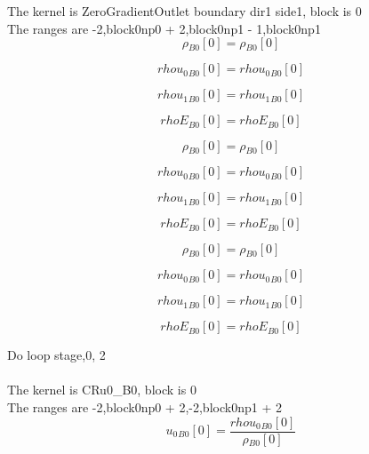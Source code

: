 \documentclass{article}
\begin{document}
\noindent The kernel is ZeroGradientOutlet boundary dir1 side1, block is 0\\\noindent The ranges are -2,block0np0 + 2,block0np1 - 1,block0np1\\\begin{dmath}{\rho{_{B0}}}[{0}] = {\rho{_{B0}}}[{0}]\end{dmath}

\begin{dmath}{rhou_{0}{_{B0}}}[{0}] = {rhou_{0}{_{B0}}}[{0}]\end{dmath}

\begin{dmath}{rhou_{1}{_{B0}}}[{0}] = {rhou_{1}{_{B0}}}[{0}]\end{dmath}

\begin{dmath}{rhoE{_{B0}}}[{0}] = {rhoE{_{B0}}}[{0}]\end{dmath}

\begin{dmath}{\rho{_{B0}}}[{0}] = {\rho{_{B0}}}[{0}]\end{dmath}

\begin{dmath}{rhou_{0}{_{B0}}}[{0}] = {rhou_{0}{_{B0}}}[{0}]\end{dmath}

\begin{dmath}{rhou_{1}{_{B0}}}[{0}] = {rhou_{1}{_{B0}}}[{0}]\end{dmath}

\begin{dmath}{rhoE{_{B0}}}[{0}] = {rhoE{_{B0}}}[{0}]\end{dmath}

\begin{dmath}{\rho{_{B0}}}[{0}] = {\rho{_{B0}}}[{0}]\end{dmath}

\begin{dmath}{rhou_{0}{_{B0}}}[{0}] = {rhou_{0}{_{B0}}}[{0}]\end{dmath}

\begin{dmath}{rhou_{1}{_{B0}}}[{0}] = {rhou_{1}{_{B0}}}[{0}]\end{dmath}

\begin{dmath}{rhoE{_{B0}}}[{0}] = {rhoE{_{B0}}}[{0}]\end{dmath}

\noindent Do loop stage,0, 2\\
\\\noindent The kernel is CRu0_B0, block is 0\\\noindent The ranges are -2,block0np0 + 2,-2,block0np1 + 2\\\begin{dmath}{u_{0}{_{B0}}}[{0}] = \frac{{rhou_{0}{_{B0}}}[{0}]}{{\rho{_{B0}}}[{0}]}\end{dmath}
\end{document}
